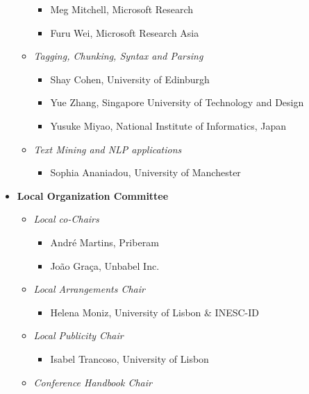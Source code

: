 \begin{itemize}[itemsep=7pt, leftmargin=0cm, label={}]
\begin{itemize}[leftmargin=0.5cm, itemsep=6pt, label={}]
\begin{itemize}[nosep, leftmargin=0.5cm, label={}]
\item Meg Mitchell, Microsoft Research
\item Furu Wei, Microsoft Research Asia
\end{itemize}
\item \emph{Tagging, Chunking, Syntax and Parsing}

\begin{itemize}[nosep, leftmargin=0.5cm, label={}]
\item Shay Cohen, University of Edinburgh
\item Yue Zhang, Singapore University of Technology and Design
\item Yusuke Miyao, National Institute of Informatics, Japan
\end{itemize}
\item \emph{Text Mining and NLP applications}

\begin{itemize}[nosep, leftmargin=0.5cm, label={}]
\item Sophia Ananiadou, University of Manchester
\end{itemize}
\end{itemize}
\item \textbf{Local Organization Committee}

\begin{itemize}[itemsep=6pt, leftmargin=0.2cm, label={}]
\item \textit{Local co-Chairs} 

\begin{itemize}[nosep, leftmargin=0.5cm, label={}]
\item André Martins, Priberam 
\item João Graça, Unbabel Inc. 
\end{itemize}
\item \emph{Local Arrangements Chair}

\begin{itemize}[nosep, leftmargin=0.5cm, label={}]
\item Helena Moniz, University of Lisbon \& INESC-ID 
\end{itemize}
\item \textit{Local Publicity Chair}

\begin{itemize}[nosep, leftmargin=0.5cm, label={}]
\item Isabel Trancoso, University of Lisbon
\end{itemize}
\item \textit{Conference Handbook Chair} 


\end{itemize}
\end{itemize}
